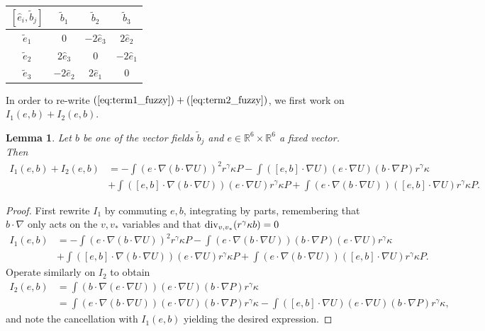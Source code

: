 \documentclass[10pt,oneside]{amsart}
\numberwithin{equation}{section}
\numberwithin{definition}{section}
\numberwithin{theorem}{section}
\newtheorem{lemma}{Lemma}
\numberwithin{lemma}{section}
\begin{document}
\begin{table}[h]
  \centering

  \begin{tabular}{c|c|c|c}
    $[\hat{e}_{i},\tilde{b}_{j}]$ & $\tilde{b}_{1}$ & $\tilde{b}_{2}$ & $\tilde{b}_{3}$\tabularnewline
    \hline 
    $\tilde{e}_{1}$ & $0$ & $-2\hat{e}_{3}$ & $2\hat{e}_{2}$\tabularnewline
    \hline 
    $\tilde{e}_{2}$ & $2\hat{e}_{3}$ & $0$ & $-2\hat{e}_{1}$\tabularnewline
    \hline 
    $\tilde{e}_{3}$ & $-2\hat{e}_{2}$ & $2\hat{e}_{1}$ & $0$\tabularnewline
  \end{tabular}
\end{table}
% 
% 
In order to re-write $(\ref{eq:term1_fuzzy})+(\ref{eq:term2_fuzzy})$, we first work on $I_1(e,b)+I_2(e,b)$.
% 
\begin{lemma}\label{lem:fuzzy_commutator_computation}
  Let $b$ be one of the vector fields $\tilde b_j$ and $e\in \mathbb R^6\times \mathbb R^6$ a fixed vector. Then
  \begin{align*}
    I_{1}(e,b)+I_{2}(e,b) & 
    =-\int\left(e\cdot\nabla\left(b\cdot\nabla U\right)\right)^{2} r^\gamma \kappa P
    -\int\left([e,b]\cdot\nabla U\right)\left(e\cdot\nabla U\right)\left(b\cdot\nabla P\right) r^\gamma \kappa\\
    & +\int\left([e,b]\cdot\nabla\left(b\cdot\nabla U\right)\right)\left(e\cdot\nabla U\right) r^\gamma \kappa P
    +\int\left(e\cdot\nabla\left(b\cdot\nabla U\right)\right)\left([e,b]\cdot\nabla U\right) r^\gamma \kappa P.
  \end{align*}
\end{lemma}
\begin{proof}
  First rewrite $I_1$ by commuting $e,b$, integrating by parts, remembering that $b\cdot\nabla$ only acts on the $v,v_*$ variables and that $\textnormal{div}_{v,v_*}(r^\gamma \kappa b)=0$
  \begin{align*}
    I_{1}(e,b) & =-\int\left(e\cdot\nabla\left(b\cdot\nabla U\right)\right)^{2} r^\gamma  \kappa P
    -\int\left(e\cdot\nabla\left(b\cdot\nabla U\right)\right)\left(b\cdot\nabla P\right)\left(e\cdot\nabla U\right) r^\gamma  \kappa\\
    & +\int\left([e,b]\cdot\nabla\left(b\cdot\nabla U\right)\right)\left(e\cdot\nabla U\right) r^\gamma  \kappa P
    +\int\left(e\cdot\nabla\left(b\cdot\nabla U\right)\right)\left([e,b]\cdot\nabla U\right) r^\gamma  \kappa P.
  \end{align*}
  Operate similarly on $I_2$ to obtain
  \begin{align*}
    I_{2}(e,b) 
    & =\int\left(b\cdot\nabla\left(e\cdot\nabla U\right)\right)\left(e\cdot\nabla U\right)\left(b\cdot\nabla P\right) r^\gamma  \kappa\\
    & =\int\left(e\cdot\nabla\left(b\cdot\nabla U\right)\right)\left(e\cdot\nabla U\right)\left(b\cdot\nabla P\right) r^\gamma  \kappa
    -\int\left([e,b]\cdot\nabla U\right)\left(e\cdot\nabla U\right)\left(b\cdot\nabla P\right) r^\gamma  \kappa,
  \end{align*}
  and note the cancellation with $I_{1}(e,b)$ yielding the desired expression.
\end{proof}
\end{document}
